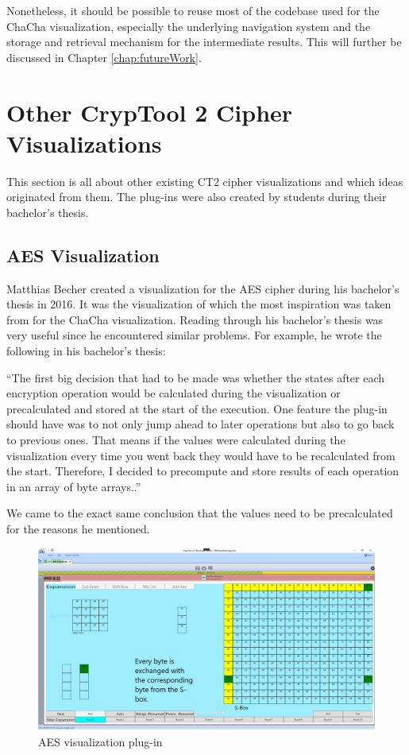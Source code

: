 Nonetheless, it should be possible to reuse most of the codebase used for the ChaCha visualization, especially the underlying navigation system and the storage and retrieval mechanism for the intermediate results. This will further be discussed in Chapter \ref{chap:futureWork}.

\section{Other CrypTool 2 Cipher Visualizations}
\label{sec:otherCT2CipherVisualizations}

This section is all about other existing CT2 cipher visualizations and which ideas originated from them. The plug-ins were also created by students during their bachelor's thesis.

\subsection{AES Visualization}
\label{sec:aesVisualization}

Matthias Becher created a visualization for the AES cipher during his bachelor's thesis in 2016. It was the visualization of which the most inspiration was taken from for the ChaCha visualization. Reading through his bachelor's thesis was very useful since he encountered similar problems. For example, he wrote the following in his bachelor's thesis:

``The first big decision that had to be made was whether the states after each encryption operation would be calculated during the visualization or precalculated and stored at the start of the execution. One feature the plug-in should have was to not only jump ahead to later operations but also to go back to previous ones. That means if the values were calculated during the visualization every time you went back they would have to be recalculated from the start. Therefore, I decided to precompute and store results of each operation in an array of byte arrays..'' \cite{aesthesis}

We came to the exact same conclusion that the values need to be precalculated for the reasons he mentioned.

\begin{figure}
\centering
\includegraphics[width=\textwidth]{figures/ct2/aes.png}
\caption{AES visualization plug-in}
\label{fig:aes}
\end{figure}

